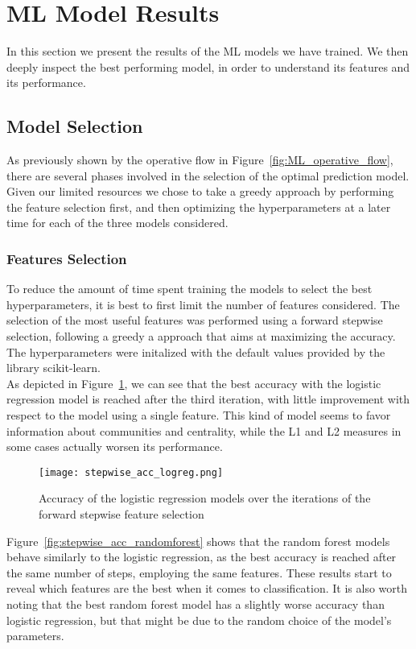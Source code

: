 \section{ML Model Results}\label{sec:results_ML}
In this section we present the results of the ML models we have trained. We then deeply inspect the best performing model,
in order to understand its features and its performance.



\subsection{Model Selection}\label{subsec:results_ML_model_selection}
As previously shown by the operative flow in Figure~\ref{fig:ML_operative_flow}, there are several phases involved in the
selection of the optimal prediction model. Given our limited resources we chose to take a greedy approach by performing
the feature selection first, and then optimizing the hyperparameters at a later time for each of the three models considered.
\subsubsection*{Features Selection}
To reduce the amount of time spent training the models to select the best hyperparameters, it is best to first limit the
number of features considered. The selection of the most useful features was performed using a forward stepwise selection,
following a greedy a approach that aims at maximizing the accuracy. The hyperparameters were initalized with the default
values provided by the library scikit-learn.\\
As depicted in Figure~\ref{fig:stepwise_acc_logreg}, we can see that the best accuracy with the logistic regression
model is reached after the third iteration, with little improvement with respect to the model using a single feature.
This kind of model seems to favor information about communities and centrality, while the L1 and L2 measures in some cases actually worsen its performance.
\begin{figure}[H]
	\centering
	\texttt{[image: stepwise\_acc\_logreg.png]}
	\caption{Accuracy of the logistic regression models over the iterations of the forward stepwise feature selection}\label{fig:stepwise_acc_logreg}
\end{figure}
\noindent
Figure~\ref{fig:stepwise_acc_randomforest} shows that the random forest models behave similarly to the logistic regression,
as the best accuracy is reached after the same number of steps, employing the same features.
These results start to reveal which features are the best when it comes to classification.
It is also worth noting that the best random forest model has a slightly worse accuracy than logistic regression,
but that might be due to the random choice of the model's parameters.

